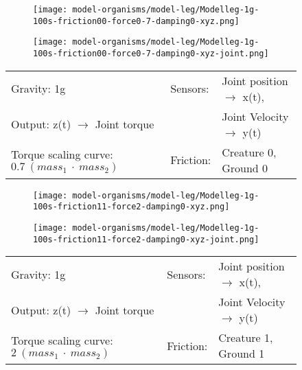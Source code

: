 \documentclass[main]{subfiles}
\begin{document}
\begin{figure}[H]
	\centering
		\begin{subfigure}[c]{0.45\textwidth}
	\texttt{[image: model-organisms/model-leg/Modelleg-1g-100s-friction00-force0-7-damping0-xyz.png]}
		\end{subfigure}
	\begin{subfigure}[c]{0.45\textwidth}
	\texttt{[image: model-organisms/model-leg/Modelleg-1g-100s-friction00-force0-7-damping0-xyz-joint.png]}
		\end{subfigure}
	\caption[Limited chaotic controller controlling model leg]{}
	\begin{tabular}{l|ll}
	\hline 
	Gravity: 1g  & Sensors: & Joint position \(\rightarrow\) x(t),\\
	 Output: z(t) \(\rightarrow\) Joint torque &  & Joint Velocity \(\rightarrow\) y(t) \\
	  Torque scaling curve: \(0.7~(mass_1~\cdot~mass_2)\) & Friction: & Creature 0, Ground 0 \\
	  \hline
	\end{tabular}
	
	\label{figure:limited-damped-model-leg-collision1}
\end{figure}

\begin{figure}[H]
	\centering
		\begin{subfigure}[c]{0.45\textwidth}
	\texttt{[image: model-organisms/model-leg/Modelleg-1g-100s-friction11-force2-damping0-xyz.png]}
		\end{subfigure}
	\begin{subfigure}[c]{0.45\textwidth}
	\texttt{[image: model-organisms/model-leg/Modelleg-1g-100s-friction11-force2-damping0-xyz-joint.png]}
		\end{subfigure}
	\caption[Limited chaotic controller controlling model leg]{}
	\begin{tabular}{l|ll}
	\hline 
	Gravity: 1g  & Sensors: & Joint position \(\rightarrow\) x(t),\\
	 Output: z(t) \(\rightarrow\) Joint torque &  & Joint Velocity \(\rightarrow\) y(t) \\
	  Torque scaling curve: \(2~(mass_1~\cdot~mass_2)\) & Friction: & Creature 1, Ground 1 \\
	  \hline
	\end{tabular}

	\label{figure:limited-damped-model-leg-collision2}
\end{figure}
\end{document}
